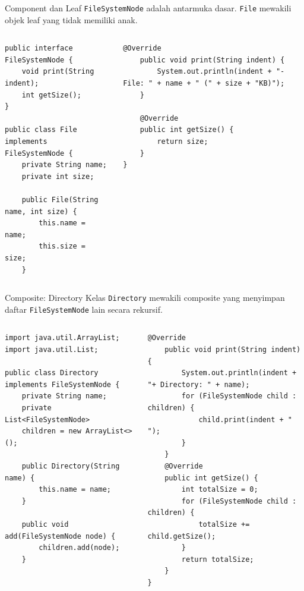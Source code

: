 \documentclass[aspectratio=169, table]{beamer}
\begin{document}
\begin{frame}[fragile]{Component dan Leaf}
\vspace{20pt}
\texttt{FileSystemNode} adalah antarmuka dasar. \texttt{File} mewakili objek leaf yang tidak memiliki anak.

\begin{columns}[T]
\begin{lstlisting}[style=JavaStyle, basicstyle=\ttfamily\scriptsize]
public interface FileSystemNode {
	void print(String indent);
	int getSize();
}

public class File implements FileSystemNode {
	private String name;
	private int size;
	
	public File(String name, int size) {
		this.name = name;
		this.size = size;
	}
\end{lstlisting}

\begin{lstlisting}[style=JavaStyle, basicstyle=\ttfamily\scriptsize]
	@Override
	public void print(String indent) {
		System.out.println(indent + "- File: " + name + " (" + size + "KB)");
	}
	
	@Override
	public int getSize() {
		return size;
	}
}
\end{lstlisting}
\end{columns}
\end{frame}


\begin{frame}[fragile]{Composite: Directory}
\vspace{20pt}
Kelas \texttt{Directory} mewakili composite yang menyimpan daftar \texttt{FileSystemNode} lain secara rekursif.

\begin{columns}[T]
\begin{lstlisting}[style=JavaStyle, basicstyle=\ttfamily\scriptsize]
import java.util.ArrayList;
import java.util.List;

public class Directory implements FileSystemNode {
	private String name;
	private List<FileSystemNode> 
	children = new ArrayList<>();
	
	public Directory(String name) {
		this.name = name;
	}
	
	public void add(FileSystemNode node) {
		children.add(node);
	}
\end{lstlisting}

\begin{lstlisting}[style=JavaStyle, basicstyle=\ttfamily\scriptsize]
	@Override
	public void print(String indent) {
		System.out.println(indent + "+ Directory: " + name);
		for (FileSystemNode child : children) {
			child.print(indent + "  ");
		}
	}
	@Override
	public int getSize() {
		int totalSize = 0;
		for (FileSystemNode child : children) {
			totalSize += child.getSize();
		}
		return totalSize;
	}
}
\end{lstlisting}
\end{columns}
\end{frame}
\end{document}
